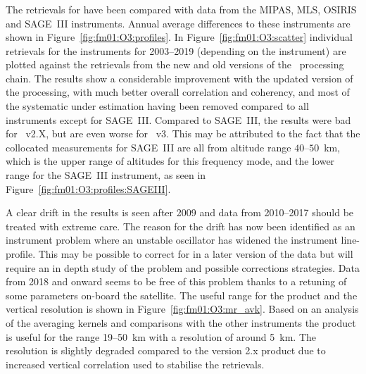 \subsubsection{}
\label{sec:fm01:comparison:O3}
The retrievals for  have been compared with data from the MIPAS, MLS,
OSIRIS and SAGE~III instruments. Annual average differences to these
instruments are shown in Figure~\ref{fig:fm01:O3:profiles}. In
Figure~\ref{fig:fm01:O3:scatter} individual retrievals for the instruments for
2003--2019 (depending on the instrument)  are plotted against the
retrievals from the new and old versions of the \smr\ processing chain. The
results show a considerable improvement with the updated version of the
processing, with much better overall correlation and coherency, and most of the
systematic under estimation having been removed compared to all instruments
except for SAGE~III.  Compared to SAGE~III, the results were bad for \smr~v2.X,
but are even worse for \smr~v3. This may be attributed to the fact that the
collocated measurements for SAGE~III are all from altitude range $40$--$50$~km,
which is the upper range of altitudes for this frequency mode, and the lower
range for the SAGE~III instrument, as seen in
Figure~\ref{fig:fm01:O3:profiles:SAGEIII}.

A clear drift in the results is seen after 2009 and data from 2010--2017
should be treated with extreme care. The reason for the drift has now been
identified as an instrument problem where an unstable oscillator has widened
the instrument line-profile. This may be possible to correct for in a later
version of the data but will require an in depth study of the problem and
possible corrections strategies. Data from 2018 and onward seems to be free
of this problem thanks to a retuning of some parameters on-board the
satellite. The useful range for the product and the vertical resolution is
shown in Figure~\ref{fig:fm01:O3:mr_avk}. Based on an analysis of the
averaging kernels and comparisons with the other instruments the product is
useful for the range 19--50~km with a resolution of around 5~km. The
resolution is slightly degraded compared to the version 2.x product due to
increased vertical correlation used to stabilise the retrievals.

